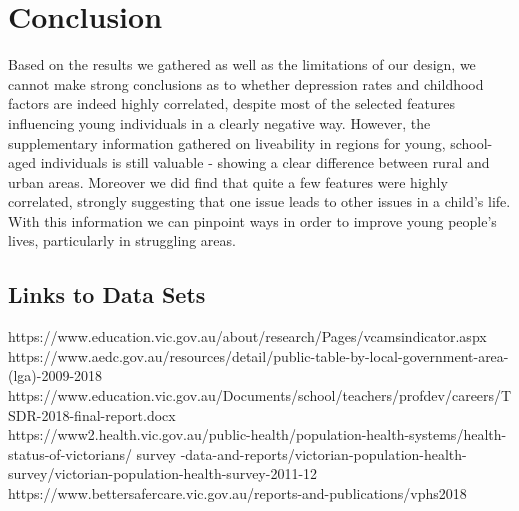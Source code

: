\documentclass[a4, 11pt]{article}
\begin{document}
\section{Conclusion}


Based on the results we gathered as well as the limitations of our design, we cannot make strong conclusions as to whether depression rates and childhood factors are indeed highly correlated, despite most of the selected features influencing young individuals in a clearly negative way. However, the supplementary information gathered on liveability in regions for young, school-aged individuals is still valuable - showing a clear difference between rural and urban areas. Moreover we did find that quite a few features were highly correlated, strongly suggesting  that one issue leads to other issues in a child’s life. With this information we can pinpoint ways in order to improve young people’s lives, particularly in struggling areas. 

\subsection*{Links to Data Sets}
https://www.education.vic.gov.au/about/research/Pages/vcamsindicator.aspx  \\
https://www.aedc.gov.au/resources/detail/public-table-by-local-government-area-(lga)-2009-2018\\
https://www.education.vic.gov.au/Documents/school/teachers/profdev/careers/TSDR-2018-final-report.docx\\
https://www2.health.vic.gov.au/public-health/population-health-systems/health-status-of-victorians/
survey -data-and-reports/victorian-population-health-survey/victorian-population-health-survey-2011-12\\
https://www.bettersafercare.vic.gov.au/reports-and-publications/vphs2018 \\
\end{document}
